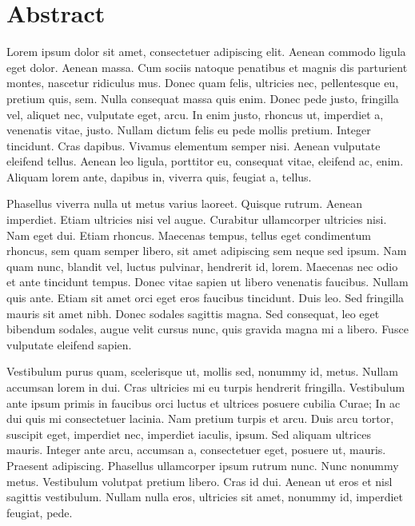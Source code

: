 \chapter*{Abstract}

\begingroup
\setlength{\parskip}{0.6em}
\setlength{\parindent}{0pt}

Lorem ipsum dolor sit amet, consectetuer adipiscing elit. Aenean commodo ligula eget dolor. Aenean massa. Cum sociis natoque penatibus et magnis dis parturient montes, nascetur ridiculus mus. Donec quam felis, ultricies nec, pellentesque eu, pretium quis, sem. Nulla consequat massa quis enim. Donec pede justo, fringilla vel, aliquet nec, vulputate eget, arcu. In enim justo, rhoncus ut, imperdiet a, venenatis vitae, justo. Nullam dictum felis eu pede mollis pretium. Integer tincidunt. Cras dapibus. Vivamus elementum semper nisi. Aenean vulputate eleifend tellus. Aenean leo ligula, porttitor eu, consequat vitae, eleifend ac, enim. Aliquam lorem ante, dapibus in, viverra quis, feugiat a, tellus.

Phasellus viverra nulla ut metus varius laoreet. Quisque rutrum. Aenean imperdiet. Etiam ultricies nisi vel augue. Curabitur ullamcorper ultricies nisi. Nam eget dui. Etiam rhoncus. Maecenas tempus, tellus eget condimentum rhoncus, sem quam semper libero, sit amet adipiscing sem neque sed ipsum. Nam quam nunc, blandit vel, luctus pulvinar, hendrerit id, lorem. Maecenas nec odio et ante tincidunt tempus. Donec vitae sapien ut libero venenatis faucibus. Nullam quis ante. Etiam sit amet orci eget eros faucibus tincidunt. Duis leo. Sed fringilla mauris sit amet nibh. Donec sodales sagittis magna. Sed consequat, leo eget bibendum sodales, augue velit cursus nunc, quis gravida magna mi a libero. Fusce vulputate eleifend sapien.

Vestibulum purus quam, scelerisque ut, mollis sed, nonummy id, metus. Nullam accumsan lorem in dui. Cras ultricies mi eu turpis hendrerit fringilla. Vestibulum ante ipsum primis in faucibus orci luctus et ultrices posuere cubilia Curae; In ac dui quis mi consectetuer lacinia. Nam pretium turpis et arcu. Duis arcu tortor, suscipit eget, imperdiet nec, imperdiet iaculis, ipsum. Sed aliquam ultrices mauris. Integer ante arcu, accumsan a, consectetuer eget, posuere ut, mauris. Praesent adipiscing. Phasellus ullamcorper ipsum rutrum nunc. Nunc nonummy metus. Vestibulum volutpat pretium libero. Cras id dui. Aenean ut eros et nisl sagittis vestibulum. Nullam nulla eros, ultricies sit amet, nonummy id, imperdiet feugiat, pede.

